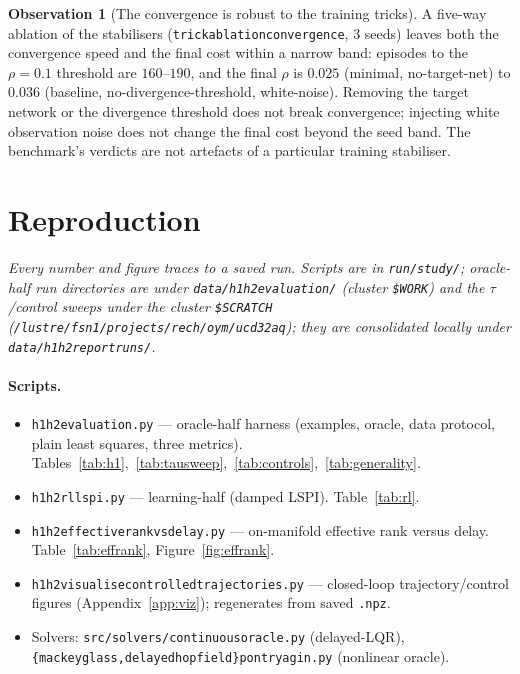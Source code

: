 \documentclass[11pt]{article}
\renewcommand{\_}{\discretionary{\textunderscore}{}{\textunderscore}}
\theoremstyle{plain}
\theoremstyle{definition}
\newtheorem{observation}[theorem]{Observation}
\begin{document}
\begin{observation}[The convergence is robust to the training tricks]\label{obs:trick}
A five-way ablation of the stabilisers (\texttt{trick\_ablation\_convergence}, 3 seeds) leaves
both the convergence speed and the final cost within a narrow band: episodes to the
$\rho=0.1$ threshold are $160$--$190$, and the final $\rho$ is $0.025$ (minimal, no-target-net)
to $0.036$ (baseline, no-divergence-threshold, white-noise). Removing the target network or the
divergence threshold does not break convergence; injecting white observation noise does not
change the final cost beyond the seed band. The benchmark's verdicts are not artefacts of a
particular training stabiliser.
\end{observation}

\section{Reproduction}\label{app:repro}

\emph{Every number and figure traces to a saved run. Scripts are in
\texttt{run/study/}; oracle-half run directories are under
\texttt{data/h1h2\_evaluation/} (cluster \texttt{\$WORK}) and the $\tau$/control sweeps under the
cluster \texttt{\$SCRATCH} (\texttt{/lustre/fsn1/projects/rech/oym/ucd32aq}); they are
consolidated locally under \texttt{data/h1h2\_report\_runs/}.}

\paragraph{Scripts.}
\begin{itemize}\setlength{\itemsep}{1pt}
\item \texttt{h1h2\_evaluation.py} --- oracle-half harness (examples, oracle, data protocol, plain
least squares, three metrics). Tables~\ref{tab:h1},~\ref{tab:tausweep},~\ref{tab:controls},~\ref{tab:generality}.
\item \texttt{h1h2\_rl\_lspi.py} --- learning-half (damped LSPI). Table~\ref{tab:rl}.
\item \texttt{h1h2\_effective\_rank\_vs\_delay.py} --- on-manifold effective rank versus delay.
Table~\ref{tab:effrank}, Figure~\ref{fig:effrank}.
\item \texttt{h1h2\_visualise\_controlled\_trajectories.py} --- closed-loop trajectory/control
figures (Appendix~\ref{app:viz}); regenerates from saved \texttt{.npz}.
\item Solvers: \texttt{src/solvers/continuous\_oracle.py} (delayed-LQR),
\texttt{\{mackey\_glass,delayed\_hopfield\}\_pontryagin.py} (nonlinear oracle).
\end{itemize}
\end{document}
